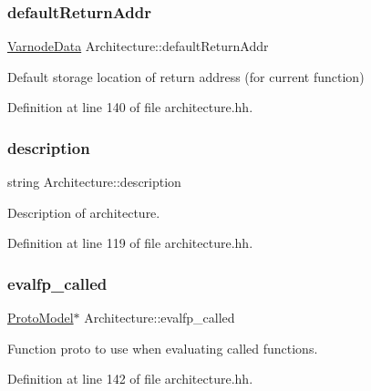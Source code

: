 \subsubsection{\texorpdfstring{defaultReturnAddr}{defaultReturnAddr}}
{\footnotesize\ttfamily \mbox{\hyperlink{struct_varnode_data}{Varnode\+Data}} Architecture\+::default\+Return\+Addr}



Default storage location of return address (for current function) 



Definition at line 140 of file architecture.\+hh.

\mbox{\label{class_architecture_ad7765062ff51f487874d768e763b82d0}} 
\subsubsection{\texorpdfstring{description}{description}}
{\footnotesize\ttfamily string Architecture\+::description}



Description of architecture. 



Definition at line 119 of file architecture.\+hh.

\mbox{\label{class_architecture_a44c624320bcc9d52dcecdf553f3b4796}} 
\subsubsection{\texorpdfstring{evalfp\_called}{evalfp\_called}}
{\footnotesize\ttfamily \mbox{\hyperlink{class_proto_model}{Proto\+Model}}$\ast$ Architecture\+::evalfp\+\_\+called}



Function proto to use when evaluating called functions. 



Definition at line 142 of file architecture.\+hh.

\mbox{\label{class_architecture_a9fb08ee0ed38a4c586a99d0f45a3af6e}} 
